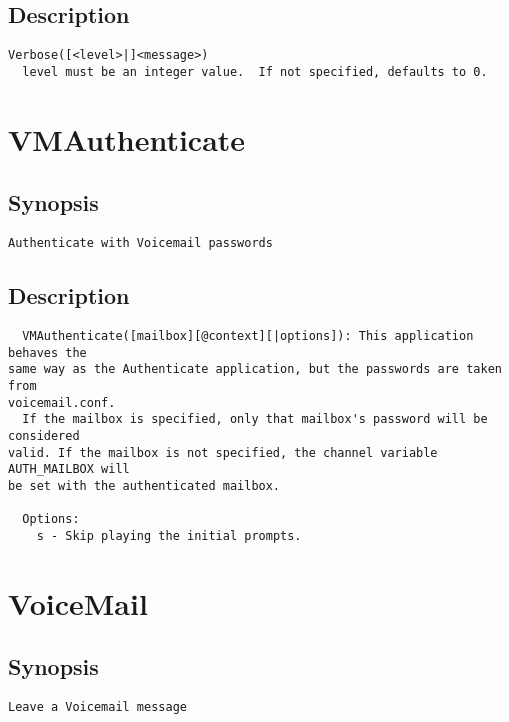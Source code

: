 \subsection{Description}
\begin{verbatim}
Verbose([<level>|]<message>)
  level must be an integer value.  If not specified, defaults to 0.

\end{verbatim}


\section{VMAuthenticate}
\subsection{Synopsis}
\begin{verbatim}
Authenticate with Voicemail passwords
\end{verbatim}
\subsection{Description}
\begin{verbatim}
  VMAuthenticate([mailbox][@context][|options]): This application behaves the
same way as the Authenticate application, but the passwords are taken from
voicemail.conf.
  If the mailbox is specified, only that mailbox's password will be considered
valid. If the mailbox is not specified, the channel variable AUTH_MAILBOX will
be set with the authenticated mailbox.

  Options:
    s - Skip playing the initial prompts.

\end{verbatim}


\section{VoiceMail}
\subsection{Synopsis}
\begin{verbatim}
Leave a Voicemail message
\end{verbatim}
